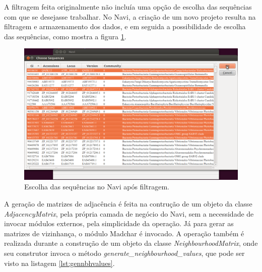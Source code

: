 A filtragem feita originalmente não incluía uma opção de escolha das sequências com que se desejasse trabalhar. No Navi, a criação de um novo projeto resulta
na filtragem e armazenamento dos dados, e em seguida a possibilidade de escolha das sequências, como mostra a figura \ref{fig:choose-sequences}.

\begin{figure}
\centering
\includegraphics[scale=0.38]{choose-sequences}
\caption{Escolha das sequências no Navi após filtragem.}
\label{fig:choose-sequences}
\end{figure}

A geração de matrizes de adjacência é feita na contrução de um objeto da classe \textit{AdjacencyMatrix}, pela própria camada de negócio do Navi, sem a
necessidade de invocar módulos externos, pela simplicidade da operação. Já para gerar as matrizes de vizinhança, o módulo Madchar é invocado. A operação
também é realizada durante a construção de um objeto da classe \textit{NeighbourhoodMatrix}, onde seu construtor invoca o método
\textit{generate\_neighbourhood\_values}, que pode ser visto na listagem \ref{lst:gennbhvalues}.

